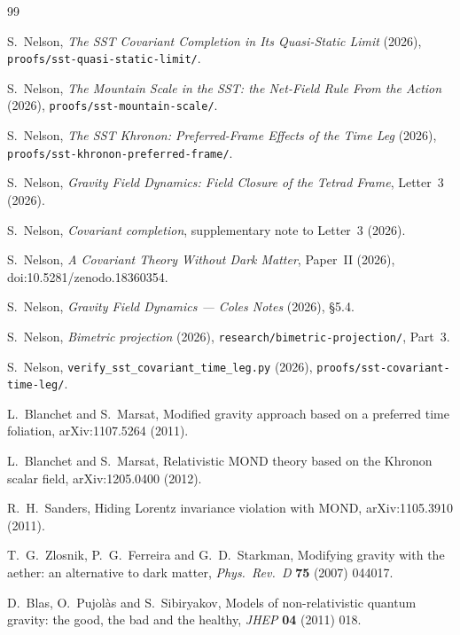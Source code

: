 \documentclass[twocolumn]{iopjournal}
\begin{document}

\begin{thebibliography}{99}

S.~Nelson,
\textit{The SST Covariant Completion in Its Quasi-Static Limit} (2026),
\texttt{proofs/sst-quasi-static-limit/}.

S.~Nelson,
\textit{The Mountain Scale in the SST: the Net-Field Rule From the
Action} (2026), \texttt{proofs/sst-mountain-scale/}.

S.~Nelson,
\textit{The SST Khronon: Preferred-Frame Effects of the Time Leg}
(2026), \texttt{proofs/sst-khronon-preferred-frame/}.

S.~Nelson,
\textit{Gravity Field Dynamics: Field Closure of the Tetrad Frame},
Letter~3 (2026).

S.~Nelson,
\textit{Covariant completion}, supplementary note to Letter~3 (2026).

S.~Nelson,
\textit{A Covariant Theory Without Dark Matter}, Paper~II (2026),
doi:10.5281/zenodo.18360354.

S.~Nelson,
\textit{Gravity Field Dynamics --- Coles Notes} (2026), \S5.4.

S.~Nelson,
\textit{Bimetric projection} (2026),
\texttt{research/bimetric-projection/}, Part~3.

S.~Nelson,
\texttt{verify\_sst\_covariant\_time\_leg.py} (2026),
\texttt{proofs/sst-covariant-time-leg/}.

L.~Blanchet and S.~Marsat,
Modified gravity approach based on a preferred time foliation,
arXiv:1107.5264 (2011).

L.~Blanchet and S.~Marsat,
Relativistic MOND theory based on the Khronon scalar field,
arXiv:1205.0400 (2012).

R.~H.~Sanders,
Hiding Lorentz invariance violation with MOND,
arXiv:1105.3910 (2011).

T.~G.~Zlosnik, P.~G.~Ferreira and G.~D.~Starkman,
Modifying gravity with the aether: an alternative to dark matter,
\textit{Phys.\ Rev.\ D} \textbf{75} (2007) 044017.

D.~Blas, O.~Pujol\`as and S.~Sibiryakov,
Models of non-relativistic quantum gravity: the good, the bad and the
healthy, \textit{JHEP} \textbf{04} (2011) 018.

\end{thebibliography}
\end{document}
